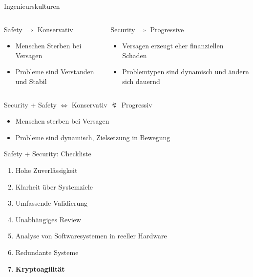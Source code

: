 \begin{frame}[T]{Ingenieurskulturen}
	\begin{columns}[t,fullwidth]
		\hfill
		\begin{column}{.45\linewidth}
			\begin{block}{Safety $\Longrightarrow$ Konservativ}
				\begin{itemize}
				\item Menschen Sterben bei Versagen
				\item Probleme sind Verstanden und Stabil
				\end{itemize}
			\end{block}
		\end{column}
		\begin{column}{.45\linewidth}
			\begin{block}{Security $\Longrightarrow$ Progressive}
				\begin{itemize}
				\item Versagen erzeugt eher finanziellen Schaden
				\item Problemtypen sind dynamisch und ändern sich dauernd
				\end{itemize}
			\end{block}
		\end{column}
		\hfill
	\end{columns}

    \begin{block}{Security + Safety $\Longleftrightarrow$ Konservativ $\lightning$ Progressiv}
	    \begin{itemize}
	      \item Menschen sterben bei Versagen
	      \item Probleme sind dynamisch, Zielsetzung in Bewegung
	    \end{itemize}
  	\end{block}
\end{frame}

\begin{frame}[T]{Safety + Security: Checkliste}
  \begin{enumerate}
    \item Hohe Zuverlässigkeit
    \item Klarheit über Systemziele
    \item Umfassende Validierung
	\item Unabhängiges Review
    \item Analyse von Softwaresystemen in reeller Hardware
    \item Redundante Systeme
    \item \textbf{Kryptoagilität}
  \end{enumerate}
\end{frame}
